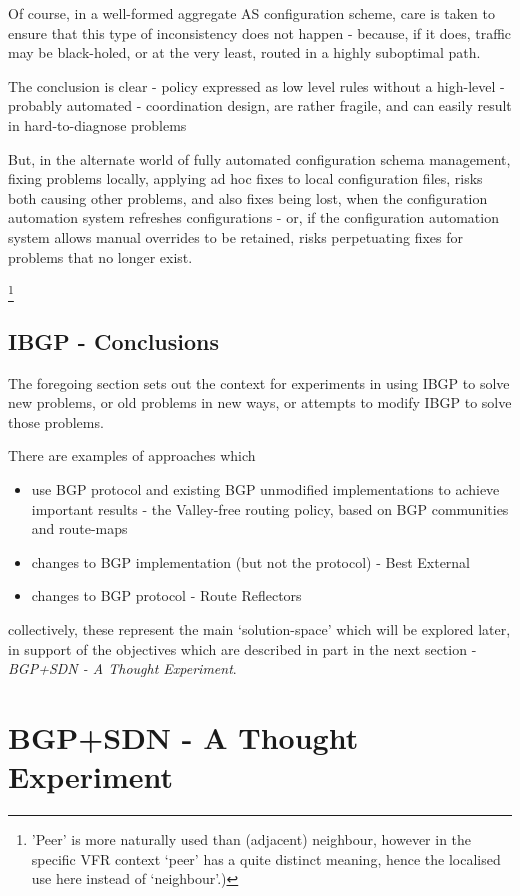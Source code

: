 Of course, in a well-formed aggregate AS configuration scheme, care is taken to ensure that this type of inconsistency does not happen - because, if it does, traffic may be black-holed, or at the very least, routed in a highly suboptimal path.

The conclusion is clear - policy expressed as low level rules without a high-level - probably automated - coordination design, are rather fragile, and can easily result in hard-to-diagnose problems

But, in the alternate world of fully automated configuration schema management, fixing problems locally, applying ad hoc fixes to local configuration files, risks both causing other problems, and also fixes being lost, when the configuration automation system refreshes configurations - or, if the configuration automation system allows manual overrides to be retained, risks perpetuating fixes for problems that no longer exist.

\footnote{'Peer' is more naturally used than (adjacent) neighbour, however in the specific VFR context `peer' has a quite distinct meaning, hence the localised use here instead of `neighbour'.)}

\subsection{IBGP - Conclusions}
The foregoing section sets out the context for experiments in using IBGP to solve new problems, or old problems in new ways, or attempts to modify IBGP to solve those problems.

There are examples of approaches which
\begin{itemize}
	\item use BGP protocol and existing BGP unmodified implementations to achieve important results - the Valley-free routing policy, based on BGP communities and route-maps
	\item changes to BGP implementation (but not the protocol) - Best External
	\item changes to BGP protocol - Route Reflectors
\end{itemize}
collectively, these represent the main `solution-space' which will be explored later, in support of the objectives which are described in part in the next section - \textit{BGP+SDN - A Thought Experiment}.
\clearpage

\section{BGP+SDN - A Thought Experiment}

